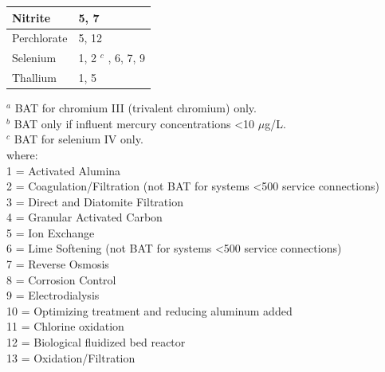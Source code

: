 \begin{table}[H]
\begin{tabular}{|l|l|}
Nitrite                                 & 5, 7                                                             \\ \hline
Perchlorate                             & 5, 12                                                            \\ \hline
Selenium                                & 1, 2 $^c$ , 6, 7, 9                                                 \\ \hline
Thallium                                & 1, 5                                                             \\ \hline
\end{tabular}
\end{table}
$^a$ BAT for chromium III (trivalent chromium) only.\\
$^b$ BAT only if influent mercury concentrations <10 $\mu$g/L.\\
$^c$ BAT for selenium IV only.\\

where:\\
1 = Activated Alumina\\
2 = Coagulation/Filtration (not BAT for systems <500 service connections)\\
3 = Direct and Diatomite Filtration\\
4 = Granular Activated Carbon\\
5 = Ion Exchange\\
6 = Lime Softening (not BAT for systems <500 service connections)\\
7 = Reverse Osmosis\\
8 = Corrosion Control\\
9 = Electrodialysis\\
10 = Optimizing treatment and reducing aluminum added\\
11 = Chlorine oxidation\\
12 = Biological fluidized bed reactor\\
13 = Oxidation/Filtration\\

